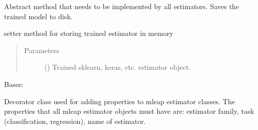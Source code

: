 \documentclass[letterpaper,10pt,english]{sphinxmanual}
\begin{document}
\begin{fulllineitems}
\begin{fulllineitems}
\begin{quote}
\begin{description}
\end{description}\end{quote}

\end{fulllineitems}


\begin{fulllineitems}
\label{\detokenize{estimators:mleap.estimators.mleap_estimator.MleapEstimator.save}}
Abstract method that needs to be implemented by all estimators.
Saves the trained model to disk.

\end{fulllineitems}


\begin{fulllineitems}
\label{\detokenize{estimators:mleap.estimators.mleap_estimator.MleapEstimator.set_trained_model}}
setter method for storing trained estimator in memory
\begin{quote}\begin{description}
\item[{Parameters}] \leavevmode
{} () \textendash{} Trained sklearn, keras, etc. estimator object.

\end{description}\end{quote}

\end{fulllineitems}


\end{fulllineitems}


\begin{fulllineitems}
\label{\detokenize{estimators:mleap.estimators.mleap_estimator.properties}}
Bases: 

Decorator class used for adding properties to mleap estimator classes. The properties that all mleap estimator objects must have are: estimator family, task (classification, regression), name of estimator.

\end{fulllineitems}
\end{document}
